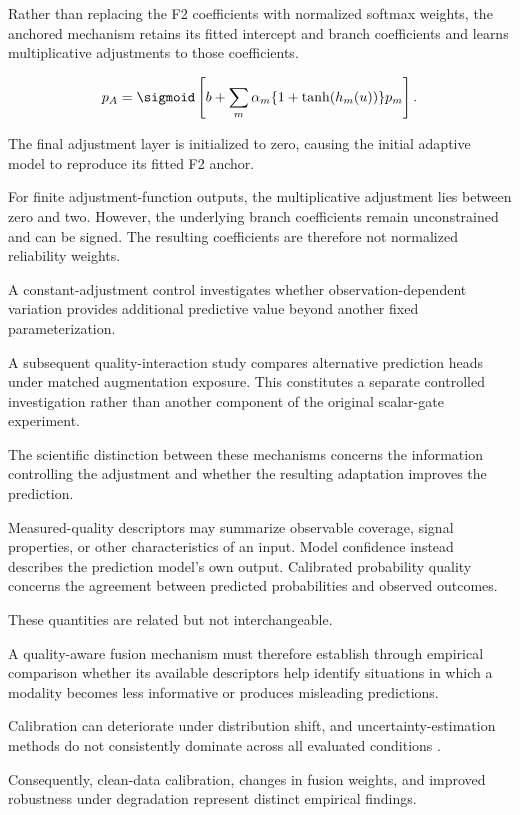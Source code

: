 Rather than replacing the F2 coefficients with normalized softmax weights, the anchored mechanism retains its fitted intercept and branch coefficients and learns multiplicative adjustments to those coefficients.

\begin{equation}
 p_A=\sigmoid\left[b+\sum_m\alpha_m\{1+\tanh(h_m(u))\}p_m\right].
 \label{eq:anchored}
\end{equation}

The final adjustment layer is initialized to zero, causing the initial adaptive model to reproduce its fitted F2 anchor.

For finite adjustment-function outputs, the multiplicative adjustment lies between zero and two. However, the underlying branch coefficients remain unconstrained and can be signed. The resulting coefficients are therefore not normalized reliability weights.

A constant-adjustment control investigates whether observation-dependent variation provides additional predictive value beyond another fixed parameterization.

A subsequent quality-interaction study compares alternative prediction heads under matched augmentation exposure. This constitutes a separate controlled investigation rather than another component of the original scalar-gate experiment.

The scientific distinction between these mechanisms concerns the information controlling the adjustment and whether the resulting adaptation improves the prediction.

Measured-quality descriptors may summarize observable coverage, signal properties, or other characteristics of an input. Model confidence instead describes the prediction model’s own output. Calibrated probability quality concerns the agreement between predicted probabilities and observed outcomes.

These quantities are related but not interchangeable.

A quality-aware fusion mechanism must therefore establish through empirical comparison whether its available descriptors help identify situations in which a modality becomes less informative or produces misleading predictions.

Calibration can deteriorate under distribution shift, and uncertainty-estimation methods do not consistently dominate across all evaluated conditions \parencite{P008}.

Consequently, clean-data calibration, changes in fusion weights, and improved robustness under degradation represent distinct empirical findings.

